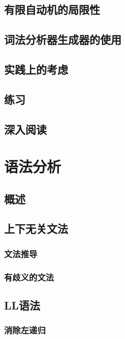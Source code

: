 \documentclass[cn,11pt,chinese]{elegantbook}
\begin{document}
\section{有限自动机的局限性}

\section{词法分析器生成器的使用}

\section{实践上的考虑}

\section{练习}

\section{深入阅读}

\chapter{语法分析}

\section{概述}

\section{上下无关文法}

\subsection{文法推导}

\subsection{有歧义的文法}

\section{LL语法}

\subsection{消除左递归}
\end{document}
